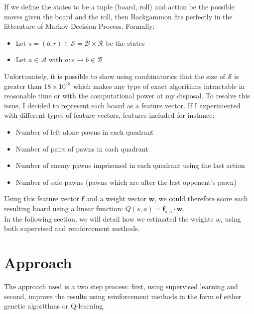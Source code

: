 \documentclass[11pt]{article}
\begin{document}
If we define the states to be a tuple (board, roll) and action be the possible moves given the board and the roll, then Backgammon fits perfectly in the litterature of Markov Decision Process. Formally:
\begin{itemize}
\item Let $s = (b, r) \in \mathcal{S} = \mathcal{B}\times\mathcal{R}$ be the states
\item Let $a \in \mathcal{A}$ with $a: s\rightarrow b \in \mathcal{B}$
\end{itemize}
\noindent Unfortunately, it is possible to show using combinatorics that the size of $\mathcal{S}$ is greater than $18\times10^{18}$ which makes any type of exact algorithms intractable in reasonable time or with the computational power at my disposal. To resolve this issue, I decided to represent each board as a feature vector. If I experimented with different types of feature vectors, features included for instance:
\begin{itemize}
\item Number of left alone pawns in each quadrant
\item Number of pairs of pawns in each quadrant
\item Number of enemy pawns imprisoned in each quadrant using the last action
\item Number of safe pawns (pawns which are after the last oppenent's pawn)
\end{itemize}
Using this feature vector $\mathbf{f}$ and a weight vector $\mathbf{w}$, we could therefore score each resulting board using a linear function: $Q(s, a) = \mathbf{f}_{s,a}\cdot\mathbf{w}$. \\

\noindent In the following section, we will detail how we estimated the weights $w_i$ using both supervised and reinforcement methods. 
\section{Approach}
The approach used is a two step process: first, using supervised learning and second, improve the results using reinforcement methods in the form of either genetic algorithms or Q-learning.
\end{document}
